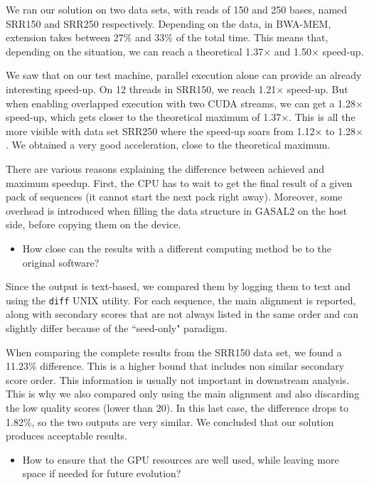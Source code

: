 We ran our solution on two data sets, with reads of 150 and 250 bases, named SRR150 and SRR250 respectively. Depending on the data, in BWA-MEM, extension takes between 27\% and 33\% of the total time. This means that, depending on the situation, we can reach a theoretical 1.37$\times$ and 1.50$\times$ speed-up.

We saw that on our test machine, parallel execution alone can provide an already interesting speed-up. On 12 threads in SRR150, we reach 1.21$\times$ speed-up. But when enabling overlapped execution with two CUDA streams, we can get a 1.28$\times$ speed-up, which gets closer to the theoretical maximum of 1.37$\times$. This is all the more visible with data set SRR250 where the speed-up soars from 1.12$\times$ to 1.28$\times$. We obtained a very good acceleration, close to the theoretical maximum. 

There are various reasons explaining the difference between achieved and maximum speedup. First, the CPU has to wait to get the final result of a given pack of sequences (it cannot start the next pack right away). Moreover, some overhead is introduced when filling the data structure in GASAL2 on the host side, before copying them on the device.

\begin{itemize}
	\item How close can the results with a different computing method be to the original software?
\end{itemize}

Since the output is text-based, we compared them by logging them to text and using the \verb|diff| UNIX utility. For each sequence, the main alignment is reported, along with secondary scores that are not always listed in the same order and can slightly differ because of the ``seed-only" paradigm.

When comparing the complete results from the SRR150 data set, we found a 11.23\% difference. This is a higher bound that includes non similar secondary score order. This information is usually not important in downstream analysis. This is why we also compared only using the main alignment and also discarding the low quality scores (lower than 20). In this last case, the difference drops to 1.82\%, so the two outputs are very similar. We concluded that our solution produces acceptable results.

\begin{itemize}
	\item How to ensure that the GPU resources are well used, while leaving more space if needed for future evolution?
\end{itemize}

